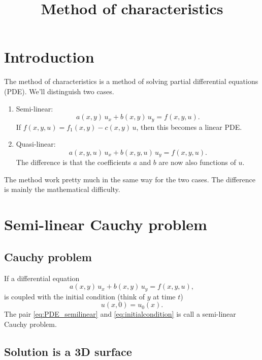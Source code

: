 \documentclass{article}
\begin{document}
\title{Method of characteristics}
\author{ \vspace{-10ex} }
\date{ \vspace{-10ex} }
\maketitle

\tableofcontents

\section{Introduction}

The method of characteristics
is a method of solving partial differential equations (PDE).
%
We'll distinguish two cases.
\begin{enumerate}
\item Semi-linear:
  $$a(x, y) \, u_x + b(x, y) \, u_y = f(x, y, u).$$
  If $f(x, y, u) = f_1(x, y) - c(x, y) \, u$,
  then this becomes a linear PDE.

\item Quasi-linear:
  $$a(x, y, u) \, u_x + b(x, y, u) \, u_y = f(x, y, u).$$
  The difference is that the coefficients $a$ and $b$
  are now also functions of $u$.
\end{enumerate}
The method work pretty much in the same way
for the two cases.
The difference is mainly the mathematical difficulty.


\section{Semi-linear Cauchy problem}

\subsection{Cauchy problem}

If a differential equation
\begin{equation}
a(x, y) \, u_x  + b(x, y) \, u_y = f(x,y, u),
\label{eq:PDE_semilinear}
\end{equation}
is coupled with the initial condition (think of $y$ at time $t$)
\begin{equation}
u(x, 0) = u_0(x).
\label{eq:initialcondition}
\end{equation}
The pair \eqref{eq:PDE_semilinear} and \eqref{eq:initialcondition}
is call a semi-linear Cauchy problem.


\subsection{Solution is a 3D surface}
\end{document}
